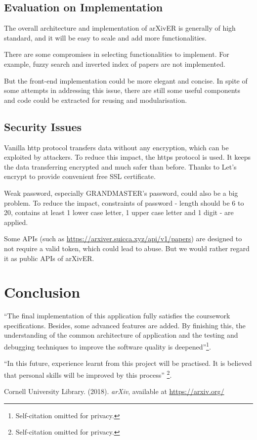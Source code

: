 \documentclass[letterpaper,12pt]{article}
\begin{document}
    \subsection{Evaluation on Implementation}
    
    The overall architecture and implementation of arXivER is generally of high standard, and it will be easy to scale and add more functionalities.
    
    There are some compromises in selecting functionalities to implement. For example, fuzzy search and inverted index of papers are not implemented.
    
    But the front-end implementation could be more elegant and concise. In spite of some attempts in addressing this issue, there are still some useful components and code could be extracted for reusing and modularisation.
    
    \subsection{Security Issues}
    Vanilla http protocol transfers data without any encryption, which can be exploited by attackers. To reduce this impact, the https protocol is used. It keeps the data transferring encrypted and much safer than before.
    Thanks to Let's encrypt to provide convenient free SSL certificate.
    
    Weak password, especially GRANDMASTER's password, could also be a big problem. To reduce the impact, constraints of password - length should be 6 to 20, contains at least 1 lower case letter, 1 upper case letter and 1 digit - are applied.
    
    Some APIs (such as \url{https://arxiver.suicca.xyz/api/v1/papers}) are designed to not require a valid token, which could lead to abuse. But we would rather regard it as public APIs of arXivER.
    
    \section{Conclusion}

    ``The final implementation of this application fully satisfies the coursework specifications. Besides, some advanced features are added. By finishing this, the understanding of the common architecture of application and the testing and debugging techniques to improve the software quality is deepened''\footnote{Self-citation omitted for privacy.}.

    ``In this future, experience learnt from this project will be practised. It is believed that personal skills will be improved by this process'' \footnote{Self-citation omitted for privacy.}.


	\begin{thebibliography}{99}
        
        		Cornell University Library. (2018). \textit{arXiv}, available at
        		\url{https://arxiv.org/}

	\end{thebibliography}
\end{document}
